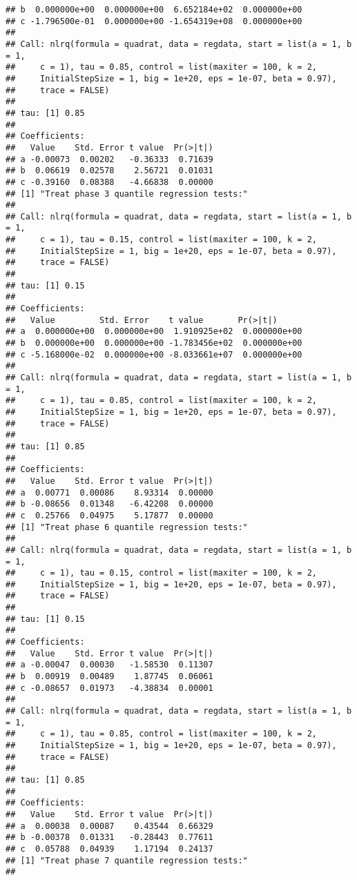 \documentclass[
]{article}
\begin{document}
\begin{verbatim}
## b  0.000000e+00  0.000000e+00  6.652184e+02  0.000000e+00
## c -1.796500e-01  0.000000e+00 -1.654319e+08  0.000000e+00
## 
## Call: nlrq(formula = quadrat, data = regdata, start = list(a = 1, b = 1, 
##     c = 1), tau = 0.85, control = list(maxiter = 100, k = 2, 
##     InitialStepSize = 1, big = 1e+20, eps = 1e-07, beta = 0.97), 
##     trace = FALSE)
## 
## tau: [1] 0.85
## 
## Coefficients:
##   Value    Std. Error t value  Pr(>|t|)
## a -0.00073  0.00202   -0.36333  0.71639
## b  0.06619  0.02578    2.56721  0.01031
## c -0.39160  0.08388   -4.66838  0.00000
## [1] "Treat phase 3 quantile regression tests:"
## 
## Call: nlrq(formula = quadrat, data = regdata, start = list(a = 1, b = 1, 
##     c = 1), tau = 0.15, control = list(maxiter = 100, k = 2, 
##     InitialStepSize = 1, big = 1e+20, eps = 1e-07, beta = 0.97), 
##     trace = FALSE)
## 
## tau: [1] 0.15
## 
## Coefficients:
##   Value         Std. Error    t value       Pr(>|t|)     
## a  0.000000e+00  0.000000e+00  1.910925e+02  0.000000e+00
## b  0.000000e+00  0.000000e+00 -1.783456e+02  0.000000e+00
## c -5.168000e-02  0.000000e+00 -8.033661e+07  0.000000e+00
## 
## Call: nlrq(formula = quadrat, data = regdata, start = list(a = 1, b = 1, 
##     c = 1), tau = 0.85, control = list(maxiter = 100, k = 2, 
##     InitialStepSize = 1, big = 1e+20, eps = 1e-07, beta = 0.97), 
##     trace = FALSE)
## 
## tau: [1] 0.85
## 
## Coefficients:
##   Value    Std. Error t value  Pr(>|t|)
## a  0.00771  0.00086    8.93314  0.00000
## b -0.08656  0.01348   -6.42208  0.00000
## c  0.25766  0.04975    5.17877  0.00000
## [1] "Treat phase 6 quantile regression tests:"
## 
## Call: nlrq(formula = quadrat, data = regdata, start = list(a = 1, b = 1, 
##     c = 1), tau = 0.15, control = list(maxiter = 100, k = 2, 
##     InitialStepSize = 1, big = 1e+20, eps = 1e-07, beta = 0.97), 
##     trace = FALSE)
## 
## tau: [1] 0.15
## 
## Coefficients:
##   Value    Std. Error t value  Pr(>|t|)
## a -0.00047  0.00030   -1.58530  0.11307
## b  0.00919  0.00489    1.87745  0.06061
## c -0.08657  0.01973   -4.38834  0.00001
## 
## Call: nlrq(formula = quadrat, data = regdata, start = list(a = 1, b = 1, 
##     c = 1), tau = 0.85, control = list(maxiter = 100, k = 2, 
##     InitialStepSize = 1, big = 1e+20, eps = 1e-07, beta = 0.97), 
##     trace = FALSE)
## 
## tau: [1] 0.85
## 
## Coefficients:
##   Value    Std. Error t value  Pr(>|t|)
## a  0.00038  0.00087    0.43544  0.66329
## b -0.00378  0.01331   -0.28443  0.77611
## c  0.05788  0.04939    1.17194  0.24137
## [1] "Treat phase 7 quantile regression tests:"
## 

\end{verbatim}
\end{document}
